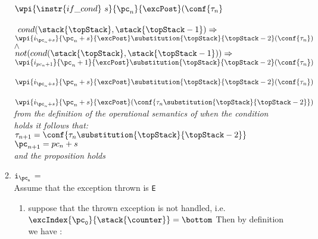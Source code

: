 \begin{enumerate}
\begin{enumerate}
		$\wpi{ \instr{if\_cond } \ s } {\pc_n  }{\excPost}  (\conf{\state{n}}$  \\
		 \\
	$  \ cond( \stack{\topStack}, \stack{\topStack - 1} ) \Rightarrow $  \\
\Myspace \Myspace $\wpi{ i_{\pc_n + s}}{\pc_n + s}{\excPost} \substitution{\topStack}{\topStack - 2} (\conf{\state{n}})$ \\ 
		$\wedge$\\
		$not(cond( \stack{\topStack}, \stack{\topStack - 1} )) \Rightarrow $ \\
\Myspace \Myspace $\wpi{i_{pc_{n} + 1} }{\pc_n + 1 }{\excPost} \substitution{\topStack}{\topStack - 2} (\conf{\state{n}} ) $\\
		\\
  		$ \wpi{ i_{\pc_n + s } }{\pc_n + s}{\excPost} \substitution{\topStack}{\topStack - 2}(\conf{\state{n}} )$ \\
  		\\
 		$ \wpi{ i_{\pc_n + s } }{\pc_n + s }{\excPost}(\conf{\state{n} \substitution{\topStack}{\topStack - 2} }  )$ \\
		 \textit{ from the definition of the operational semantics of } \textit{ when the condition holds it  follows that:} \\
		
$\state{n + 1} = \conf{\state{n} \substitution{\topStack }{\topStack - 2}}$ \\	
	$  	\pc_{n+1}= pc_n + s $ \\
	 \textit{and the proposition holds  }

	\item $\tt{i_{\pc_n}}$ =  \\
		Assume that the exception thrown is \texttt{E}
		\begin{enumerate}
			\item suppose that the thrown exception is not handled, i.e.  $\tt{ \excIndex{\pc_0 }{\stack{\counter}}}=\bottom$   
				Then by definition we have :\\
		            

\end{enumerate}
\end{enumerate}
\end{enumerate}
